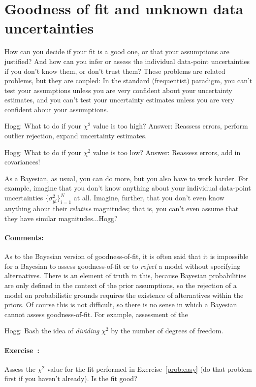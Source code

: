 \documentclass[12pt]{article}
\newcommand{\problemname}{Exercise}
\newcommand{\commentsname}{Comments}
\newcounter{problem}
\newenvironment{problem}{\paragraph{\problemname~\theproblem:}\refstepcounter{problem}}{}
\newenvironment{comments}{\paragraph{\commentsname:}}{}
\newcommand{\setofall}[3]{\{{#1}\}_{{#2}}^{{#3}}}
\newcommand{\allsigmay}{\setofall{\sigma_{yi}^2}{i=1}{N}}
\begin{document}
\section{Goodness of fit and unknown data uncertainties}\label{sec:goodness}

How can you decide if your fit is a good one, or that your assumptions
are justified?  And how can you infer or assess the individual
data-point uncertainties if you don't know them, or don't trust them?
These problems are related problems, but they are coupled: In the
standard (frequentist) paradigm, you can't test your assumptions
unless you are very confident about your uncertainty estimates, and
you can't test your uncertainty estimates unless you are very
confident about your assumptions.

Hogg: What to do if your $\chi^2$ value is too high?  Answer: Reassess
errors, perform outlier rejection, expand uncertainty estimates.

Hogg: What to do if your $\chi^2$ value is too low?  Answer: Reassess
errors, add in covariances!

As a Bayesian, as usual, you can do more, but you also have to work
harder.  For example, imagine that you don't know anything about your
individual data-point uncertainties $\allsigmay$ at all.  Imagine,
further, that you don't even know anything about their \emph{relative}
magnitudes; that is, you can't even assume that they have similar
magnitudes...Hogg?

\begin{comments}
As to the Bayesian version of goodness-of-fit, it is often said that
it is impossible for a Bayesian to assess goodness-of-fit or to
\emph{reject} a model without specifying alternatives.  There is an
element of truth in this, because Bayesian probabilities are only
defined in the context of the prior assumptions, so the rejection of a
model on probabilistic grounds requires the existence of alternatives
within the priors.  Of course this is not difficult, so there is no
sense in which a Bayesian cannot assess goodness-of-fit.  For example,
assessment of the

Hogg: Bash the idea of \emph{dividing} $\chi^2$ by the number of
degrees of freedom.
\end{comments}

\begin{problem}
Assess the $\chi^2$ value for the fit performed in
\problemname~\ref{prob:easy} (do that problem first if you haven't
already).  Is the fit good?
\end{problem}
\end{document}

